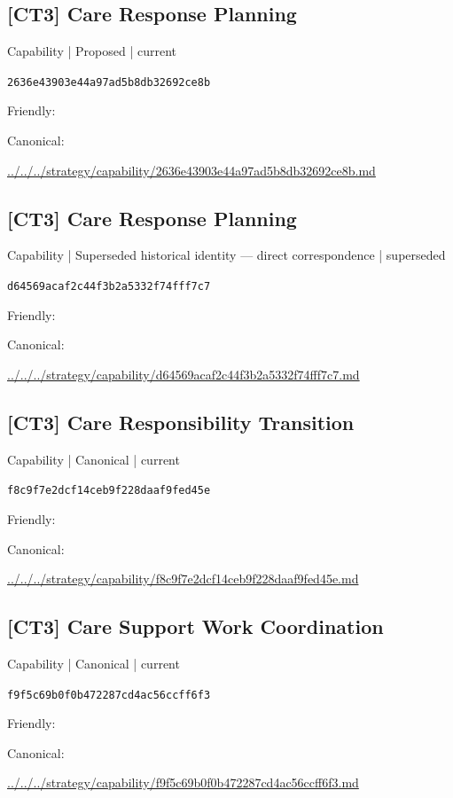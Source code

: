 \documentclass[10pt,a4paper]{article}
\begin{document}
\subsection*{[CT3] Care Response Planning}
{\small Capability | Proposed | current}\par
\texttt{2636e43903e44a97ad5b8db32692ce8b}\par
Friendly: \par
Canonical: \par
{\footnotesize\url{../../../strategy/capability/2636e43903e44a97ad5b8db32692ce8b.md}}\par
\subsection*{[CT3] Care Response Planning}
{\small Capability | Superseded historical identity — direct correspondence | superseded}\par
\texttt{d64569acaf2c44f3b2a5332f74fff7c7}\par
Friendly: \par
Canonical: \par
{\footnotesize\url{../../../strategy/capability/d64569acaf2c44f3b2a5332f74fff7c7.md}}\par
\subsection*{[CT3] Care Responsibility Transition}
{\small Capability | Canonical | current}\par
\texttt{f8c9f7e2dcf14ceb9f228daaf9fed45e}\par
Friendly: \par
Canonical: \par
{\footnotesize\url{../../../strategy/capability/f8c9f7e2dcf14ceb9f228daaf9fed45e.md}}\par
\subsection*{[CT3] Care Support Work Coordination}
{\small Capability | Canonical | current}\par
\texttt{f9f5c69b0f0b472287cd4ac56ccff6f3}\par
Friendly: \par
Canonical: \par
{\footnotesize\url{../../../strategy/capability/f9f5c69b0f0b472287cd4ac56ccff6f3.md}}\par
\end{document}
